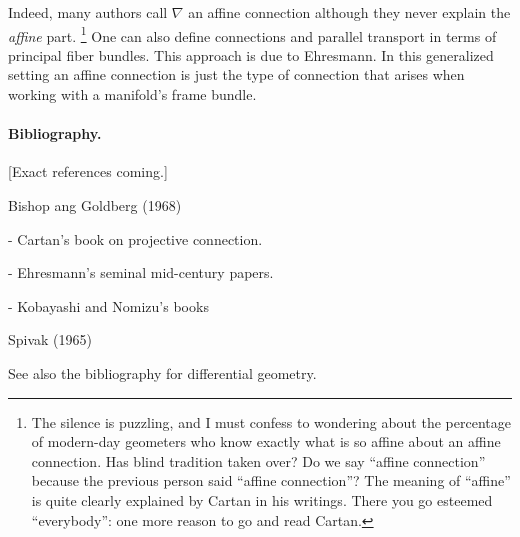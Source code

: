 \documentclass[12pt]{article}
\begin{document}
Indeed, many authors call $\nabla$ an affine connection although they
never explain the {\em affine} part. \footnote{The silence is
  puzzling, and I must confess to wondering about the percentage of
  modern-day geometers who know exactly what is so affine about an
  affine connection.  Has blind tradition taken over?  Do we say
  ``affine connection'' because the previous person said ``affine
  connection''?  The meaning of ``affine'' is quite clearly explained
  by Cartan in his writings.  There you go esteemed ``everybody'': one
  more reason to go and read Cartan.}  One can also define connections
and parallel transport in terms of principal fiber bundles.  This
approach is due to Ehresmann.  In this generalized setting an affine
connection is just the type of connection that arises when working
with a manifold's frame bundle.

\paragraph{Bibliography.}

[Exact references coming.]

Bishop ang Goldberg (1968)

- Cartan's book on projective connection.

- Ehresmann's seminal mid-century papers.

- Kobayashi and Nomizu's books

Spivak (1965)

See also the bibliography for differential geometry.
\end{document}
